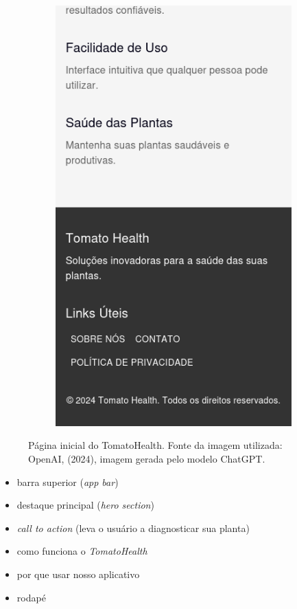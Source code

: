 \begin{figure}[p]
\begin{subfigure}{0.45\textwidth}
        \includegraphics[width=\linewidth, height=0.4\textheight, keepaspectratio]{images/homepage4.png}
    \end{subfigure}
    
    \caption{Página inicial do TomatoHealth. Fonte da imagem utilizada: OpenAI, (2024), imagem gerada pelo modelo ChatGPT.}
    \label{fig:homepage}

\end{figure}

\begin{itemize}
    \item barra superior (\textit{app bar})
    \item destaque principal (\textit{hero section})
    \item \textit{call to action} (leva o usuário a diagnosticar sua planta)
    \item como funciona o \emph{TomatoHealth}
    \item por que usar nosso aplicativo
    \item rodapé
\end{itemize}

